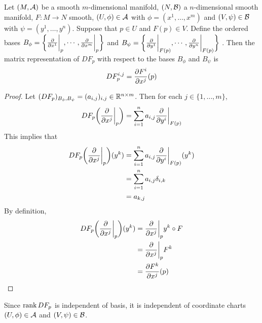 \documentclass{book}
\begin{document}
	\begin{ex}
		Let $(M, \mathcal{A})$ be a smooth $m$-dimensional manifold, $(N, \mathcal{B})$ a $n$-dimensional smooth manifold, $F: M \rightarrow N$ smooth, $(U, \phi) \in \mathcal{A}$ with $\phi = (x^1, \dots, x^m)$ and $(V, \psi) \in \mathcal{B}$ with $\psi = (y^1, \dots, y^n)$. Suppose that $p \in U$ and $F(p) \in V$. Define the ordered bases $B_\phi = \bigg \{\frac{\partial}{\partial x^1} \bigg|_p, \cdots, \frac{\partial}{\partial x^m} \bigg|_p \bigg \}$ and $B_{\psi} = \bigg \{\frac{\partial}{\partial y^1} \bigg|_{F(p)}, \cdots, \frac{\partial}{\partial y^n} \bigg|_{F(p)} \bigg \}$ .
		Then the matrix representation of $DF_p$ with respect to the bases
		$B_{\phi}$ and $B_{\psi}$ is $$ DF_p^{i,j} =  \frac{\partial F^i}{\partial x^j}(p)$$
	\end{ex}

	\begin{proof}
		Let $(DF_p)_{B_\phi, B_{\psi}} = (a_{i,j})_{i,j} \in \mathbb{R}^{n \times m}$. Then for each $j \in \{1, \dots, m\}$, $$DF_p \bigg(\frac{\partial }{\partial x^j} \bigg|_p\bigg) = \sum_{i=1}^n a_{i,j}\frac{\partial }{\partial y^i} \bigg|_{F(p)}$$
		This implies that 
		\begin{align*}
			DF_p \bigg(\frac{\partial }{\partial x^j} \bigg|_p\bigg) (y^k )
			&=   \sum_{i=1}^n a_{i,j}\frac{\partial }{\partial y^i} \bigg|_{F(p)} (y^k) \\
			&= \sum_{i=1}^n a_{i,j} \delta_{i,k} \\
			&= a_{k, j}
		\end{align*}
		By definition, 
		\begin{align*}
			DF_p \bigg(\frac{\partial }{\partial x^j} \bigg|_p\bigg) (y^k )
			&=  \frac{\partial }{\partial x^j} \bigg|_p y^k \circ F \\
			&= \frac{\partial }{\partial x^j} \bigg|_p F^k \\
			&= \frac{\partial F^k}{\partial x^j} (p)
		\end{align*}
	\end{proof}
	
	
	\begin{note}
	Since $\operatorname{\text{rank}} DF_p$ is independent of basis, it is independent of coordinate charts $(U, \phi) \in \mathcal{A}$ and $(V, \psi) \in \mathcal{B}$. 
	\end{note}	
	
	
	
	

	
	



	
	
	
	
	
	
	
	
\end{document}

